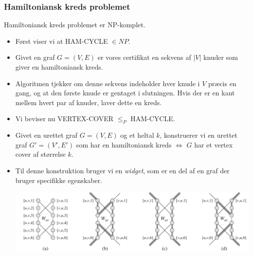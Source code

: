 \begin{frame}[allowframebreaks]
	\frametitle{Hamiltoniansk kreds problemet}

	\begin{theorem}
		Hamiltoniansk kreds problemet er NP-komplet.
	\end{theorem}
	\begin{itemize}
		\item Først viser vi at HAM-CYCLE $\in NP$.
		\item Givet en graf $G = (V,E)$ er vores certifikat en sekvens af $|V|$ knuder som giver en hamiltoniansk kreds.
		\item Algoritmen tjekker om denne sekvens indeholder hver knude i $V$ præcis en gang, og at den første knude er gentaget i slutningen. Hvis der er en kant mellem hvert par af knuder, laver dette en kreds.
		\item Vi beviser nu VERTEX-COVER $\le_P$ HAM-CYCLE.
		\item Givet en urettet graf $G = (V,E)$ og et heltal $k$, konstruerer vi en urettet graf $G' = (V', E')$ som har en hamiltoniansk kreds $\iff$ $G$ har et vertex cover af størrelse $k$.
		\item Til denne konstruktion bruger vi en \textit{widget}, som er en del af en graf der bruger specifikke egenskaber.
		      \begin{center}
			      \includegraphics[scale=0.3]{figur/figur3416.png}
		      \end{center}


\end{itemize}
\end{frame}
